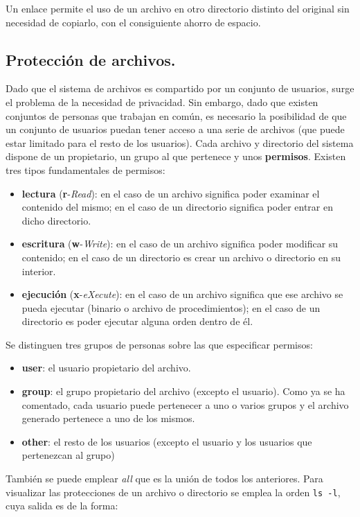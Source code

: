  Un enlace permite el uso de un archivo en otro directorio distinto
  del original sin necesidad de copiarlo, con el consiguiente ahorro
  de espacio.

\subsection{Protecci{\'o}n de archivos.}

Dado que el sistema de archivos {\unix} es compartido por un conjunto
de usuarios, surge el problema de la necesidad de privacidad. Sin
embargo, dado que existen conjuntos de personas que trabajan en com{\'u}n,
es necesario la posibilidad de que un conjunto de usuarios puedan
tener acceso a una serie de archivos (que puede estar limitado para el
resto de los usuarios).  Cada archivo y directorio del sistema dispone de
un propietario, un grupo al que pertenece y unos {\bf permisos}.
Existen tres tipos fundamentales de permisos:

\begin{itemize}
  
\item {\bf lectura} ({\bf r}-{\it Read}): en el caso de un archivo
  significa poder examinar el contenido del mismo; en el caso de un
  directorio significa poder entrar en dicho directorio.
  
\item {\bf escritura} ({\bf w}-{\it Write}): en el caso de un archivo
  significa poder modificar su contenido; en el caso de un directorio
  es crear un archivo o directorio en su interior.
  
\item {\bf ejecuci{\'o}n} ({\bf x}-{\it eXecute}): en el caso de un
  archivo significa que ese archivo se pueda ejecutar (binario o
  archivo de procedimientos); en el caso de un directorio es poder
  ejecutar alguna orden dentro de {\'e}l.
\end{itemize}

Se distinguen tres grupos de personas sobre las que especificar
permisos:

\begin{itemize}

\item {\bf  user}: el usuario propietario del archivo.
  
\item {\bf group}: el grupo propietario del archivo (excepto el
  usuario). Como ya se ha comentado, cada usuario puede pertenecer a
  uno o varios grupos y el archivo generado pertenece a uno de los
  mismos.
  
\item {\bf other}: el resto de los usuarios (excepto el usuario y los
  usuarios que pertenezcan al grupo)
\end{itemize}  
  Tambi{\'e}n se puede emplear {\it all} que es la uni{\'o}n de todos los
  anteriores. Para visualizar las protecciones de un archivo o
  directorio se emplea la orden \verb+ls -l+, cuya salida es de la forma:

